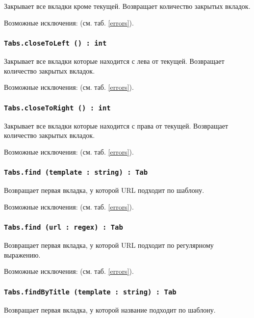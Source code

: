 Закрывает все вкладки кроме текущей. Возвращает количество закрытых вкладок.

Возможные исключения:  (см. таб. \ref{errors}).

\subsubsection{\texttt{Tabs.closeToLeft () : int}}

Закрывает все вкладки которые находится с лева от текущей. Возвращает количество закрытых вкладок.

Возможные исключения:  (см. таб. \ref{errors}).

\subsubsection{\texttt{Tabs.closeToRight () : int}}

Закрывает все вкладки которые находится с права от текущей. Возвращает количество закрытых вкладок.

Возможные исключения:  (см. таб. \ref{errors}).

\subsubsection{\texttt{Tabs.find (template : string) : Tab}}

Возвращает первая вкладка, у которой URL подходит по шаблону.

Возможные исключения:  (см. таб. \ref{errors}).

\subsubsection{\texttt{Tabs.find (url : regex) : Tab}}

Возвращает первая вкладка, у которой URL подходит по регулярному выражению.

Возможные исключения:  (см. таб. \ref{errors}).

\subsubsection{\texttt{Tabs.findByTitle (template : string) : Tab}}

Возвращает первая вкладка, у которой название подходит по шаблону.

